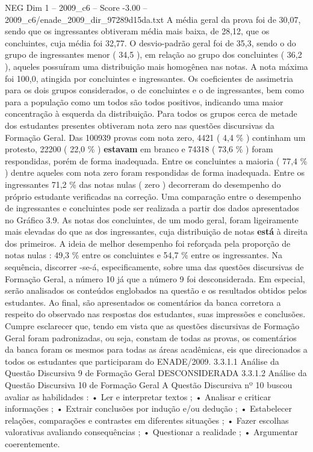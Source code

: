 \begin{textsample}{NEG Dim 1 – 2009\_c6 – Score -3.00 – 2009\_c6/enade\_2009\_dir\_97289d15da.txt}
A média geral da prova foi de 30,07, sendo que os ingressantes obtiveram média mais baixa, de 28,12, que os concluintes, cuja média foi 32,77.
O desvio-padrão geral foi de 35,3, sendo o do grupo de ingressantes menor ( 34,5 ), em relação ao grupo dos concluintes ( 36,2 ), aqueles possuíram uma distribuição mais homogênea nas notas.
A nota máxima foi 100,0, atingida por concluintes e ingressantes.
Os coeficientes de assimetria para os dois grupos considerados, o de concluintes e o de ingressantes, bem como para a população como um todos são todos positivos, indicando uma maior concentração à esquerda da distribuição.
Para todos os grupos cerca de metade dos estudantes presentes obtiveram nota zero nas questões discursivas da Formação Geral.
Das 100939 provas com nota zero, 4421 ( 4,4 \% ) continham um protesto, 22200 ( 22,0 \% ) \textbf{estavam} em branco e 74318 ( 73,6 \% ) foram respondidas, porém de forma inadequada.
Entre os concluintes a maioria ( 77,4 \% ) dentre aqueles com nota zero foram respondidas de forma inadequada.
Entre os ingressantes 71,2 \% das notas nulas ( zero ) decorreram do desempenho do próprio estudante verificadas na correção.
Uma comparação entre o desempenho de ingressantes e concluintes pode ser realizada a partir dos dados apresentados no Gráfico 3.9.
As notas dos concluintes, de um modo geral, foram ligeiramente mais elevadas do que as dos ingressantes, cuja distribuição de notas \textbf{está} à direita dos primeiros.
A ideia de melhor desempenho foi reforçada pela proporção de notas nulas : 49,3 \% entre os concluintes e 54,7 \% entre os ingressantes.
Na sequência, discorrer -se-á, especificamente, sobre uma das questões discursivas de Formação Geral, a número 10 já que a número 9 foi desconsiderada.
Em especial, serão analisados os conteúdos englobados na questão e os resultados obtidos pelos estudantes.
Ao final, são apresentados os comentários da banca corretora a respeito do observado nas respostas dos estudantes, suas impressões e conclusões.
Cumpre esclarecer que, tendo em vista que as questões discursivas de Formação Geral foram padronizadas, ou seja, constam de todas as provas, os comentários da banca foram os mesmos para todas as áreas acadêmicas, eis que direcionados a todos os estudantes que participaram do ENADE/2009. 3.3.1.1 Análise da Questão Discursiva 9 de Formação Geral DESCONSIDERADA 3.3.1.2 Análise da Questão Discursiva 10 de Formação Geral A Questão Discursiva nº 10 buscou avaliar as habilidades : • Ler e interpretar textos ; • Analisar e criticar informações ; • Extrair conclusões por indução e/ou dedução ; • Estabelecer relações, comparações e contrastes em diferentes situações ; • Fazer escolhas valorativas avaliando consequências ; • Questionar a realidade ; • Argumentar coerentemente.

\end{textsample}
